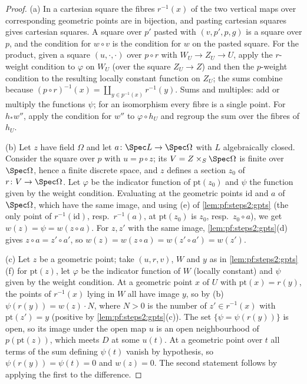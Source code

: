 \begin{proof}
(a) In a cartesian square the fibres $r^{-1}(x)$ of the two vertical maps over corresponding
geometric points are in bijection, and pasting cartesian squares gives cartesian squares. A square
over $p'$ pasted with $(v,p',p,g)$ is a square over $p$, and the condition for $w\circ v$ is the
condition for $w$ on the pasted square. For the product, given a square $(u,\cdot,\cdot)$ over
$p\circ r$ with $W_U\to Z_U\to U$, apply the $r$-weight condition to $\varphi$ on $W_U$ (over the
square $Z_U\to Z$) and then the $p$-weight condition to the resulting locally constant function on
$Z_U$; the sums combine because $(p\circ r)^{-1}(x)=\coprod_{y\in p^{-1}(x)}r^{-1}(y)$. Sums and
multiples: add or multiply the functions $\psi$; for an isomorphism every fibre is a single point. For
$h_\ast w''$, apply the condition for $w''$ to $\varphi\circ h_U$ and regroup the sum over the fibres of
$h_U$.

(b) Let $z$ have field $\Omega$ and let $a\colon\Spec L\to\Spec\Omega$ with $L$ algebraically closed.
Consider the square over $p$ with $u=p\circ z$; its $V=Z\times_S\Spec\Omega$ is finite over
$\Spec\Omega$, hence a finite discrete space, and $z$ defines a section $z_0$ of $r\colon V\to\Spec
\Omega$. Let $\varphi$ be the indicator function of $\mathrm{pt}(z_0)$ and $\psi$ the function given by
the weight condition. Evaluating at the geometric points $\mathrm{id}$ and $a$ of $\Spec\Omega$, which
have the same image, and using (e) of \cref{lem:pf:steps2:gpts} (the only point of $r^{-1}(\mathrm{id})$,
resp.\ $r^{-1}(a)$, at $\mathrm{pt}(z_0)$ is $z_0$, resp.\ $z_0\circ a$), we get
$w(z)=\psi=w(z\circ a)$. For $z,z'$ with the same image, \cref{lem:pf:steps2:gpts}(d) gives $z\circ
a=z'\circ a'$, so $w(z)=w(z\circ a)=w(z'\circ a')=w(z')$.

(c) Let $z$ be a geometric point; take $(u,r,v)$, $W$ and $y$ as in \cref{lem:pf:steps2:gpts}(f) for
$\mathrm{pt}(z)$, let $\varphi$ be the indicator function of $W$ (locally constant) and $\psi$ given by the
weight condition. At a geometric point $x$ of $U$ with $\mathrm{pt}(x)=r(y)$, the points of $r^{-1}(x)$
lying in $W$ all have image $y$, so by (b) $\psi(r(y))=w(z)\cdot N$, where $N>0$ is the number of
$z'\in r^{-1}(x)$ with $\mathrm{pt}(z')=y$ (positive by \cref{lem:pf:steps2:gpts}(c)). The set
$\{\psi=\psi(r(y))\}$ is open, so its image under the open map $u$ is an open neighbourhood of
$p(\mathrm{pt}(z))$, which meets $D$ at some $u(t)$. At a geometric point over $t$ all terms of the sum
defining $\psi(t)$ vanish by hypothesis, so $\psi(r(y))=\psi(t)=0$ and $w(z)=0$. The second statement
follows by applying the first to the difference.


\end{proof}
